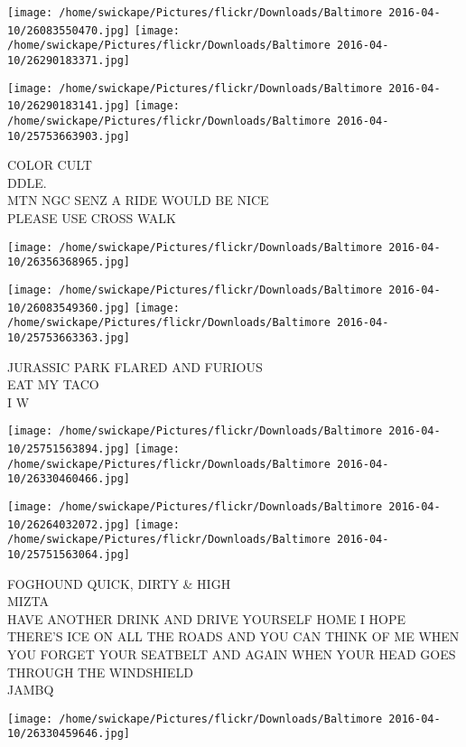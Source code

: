 \documentclass[10pt,letterpaper]{article}
\begin{document}
\texttt{[image: /home/swickape/Pictures/flickr/Downloads/Baltimore 2016-04-10/26083550470.jpg]}
\texttt{[image: /home/swickape/Pictures/flickr/Downloads/Baltimore 2016-04-10/26290183371.jpg]}

\texttt{[image: /home/swickape/Pictures/flickr/Downloads/Baltimore 2016-04-10/26290183141.jpg]}
\texttt{[image: /home/swickape/Pictures/flickr/Downloads/Baltimore 2016-04-10/25753663903.jpg]}

COLOR CULT\\
DDLE.\\
MTN NGC SENZ A RIDE WOULD BE NICE\\
PLEASE USE CROSS WALK\\
\pagebreak

\texttt{[image: /home/swickape/Pictures/flickr/Downloads/Baltimore 2016-04-10/26356368965.jpg]}

\vspace{0.25in}
\texttt{[image: /home/swickape/Pictures/flickr/Downloads/Baltimore 2016-04-10/26083549360.jpg]}
\texttt{[image: /home/swickape/Pictures/flickr/Downloads/Baltimore 2016-04-10/25753663363.jpg]}

JURASSIC PARK FLARED AND FURIOUS\\
EAT MY TACO\\
I W\\
\pagebreak

\texttt{[image: /home/swickape/Pictures/flickr/Downloads/Baltimore 2016-04-10/25751563894.jpg]}
\texttt{[image: /home/swickape/Pictures/flickr/Downloads/Baltimore 2016-04-10/26330460466.jpg]}

\texttt{[image: /home/swickape/Pictures/flickr/Downloads/Baltimore 2016-04-10/26264032072.jpg]}
\texttt{[image: /home/swickape/Pictures/flickr/Downloads/Baltimore 2016-04-10/25751563064.jpg]}

FOGHOUND QUICK, DIRTY \& HIGH\\
MIZTA\\
HAVE ANOTHER DRINK AND DRIVE YOURSELF HOME I HOPE THERE'S ICE ON ALL THE ROADS AND YOU CAN THINK OF ME WHEN YOU FORGET YOUR SEATBELT AND AGAIN WHEN YOUR HEAD GOES THROUGH THE WINDSHIELD\\
JAMBQ\\
\pagebreak

\texttt{[image: /home/swickape/Pictures/flickr/Downloads/Baltimore 2016-04-10/26330459646.jpg]}
\end{document}
